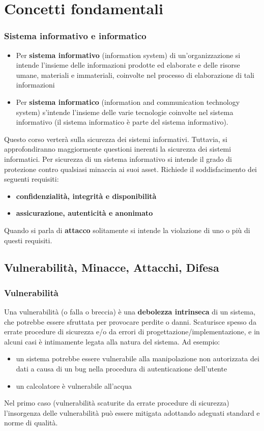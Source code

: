 \section{Concetti fondamentali}

\subsubsection{Sistema informativo e informatico}

\begin{itemize} 
  \item Per \textbf{sistema informativo} (information system) di un'organizzazione si intende l'insieme delle informazioni prodotte ed elaborate e delle risorse umane, materiali e immateriali, coinvolte nel processo di elaborazione di tali informazioni
  \item Per \textbf{sistema informatico} (information and communication technology system) s'intende l'insieme delle varie tecnologie coinvolte nel sistema informativo (il sistema informatico è parte del sistema informativo).
\end{itemize}
Questo corso verterà sulla sicurezza dei sistemi informativi. Tuttavia, si approfondiranno maggiormente questioni inerenti la sicurezza
dei sistemi informatici. Per sicurezza di un sistema informativo si intende il grado di protezione contro qualsiasi minaccia ai suoi asset.
Richiede il soddisfacimento dei seguenti requisiti:
\begin{itemize} 
  \item \textbf{confidenzialità, integrità e disponibilità}
  \item \textbf{assicurazione, autenticità e anonimato}
\end{itemize}
Quando si parla di \textbf{attacco} solitamente si intende la violazione di uno o più di questi requisiti.

\subsection{Vulnerabilità, Minacce, Attacchi, Difesa}
\subsubsection{Vulnerabilità}
Una vulnerabilità (o falla o breccia) è una \textbf{debolezza intrinseca} di un sistema, che potrebbe essere sfruttata per provocare perdite o danni. Scaturisce spesso da errate procedure di sicurezza e/o da errori di progettazione/implementazione, e  in alcuni casi è intimamente legata alla natura del sistema. Ad esempio:
\begin{itemize} 
  \item un sistema potrebbe essere vulnerabile alla manipolazione non autorizzata dei dati a causa di un bug nella procedura di autenticazione dell'utente
  \item un calcolatore è vulnerabile all'acqua
\end{itemize}
Nel primo caso (vulnerabilità scaturite da errate procedure di sicurezza) l'insorgenza delle vulnerabilità può essere mitigata adottando adeguati standard e norme di qualità.

